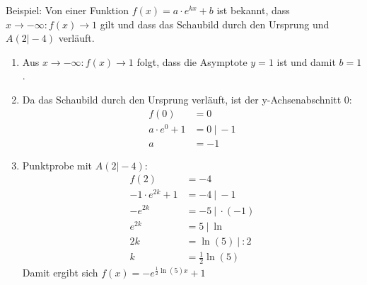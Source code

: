 Beispiel: Von einer Funktion \(f(x)=a\cdot e^{kx}+b\) ist bekannt, dass \(x\to-\infty\colon f(x)\to1\) gilt und dass das Schaubild durch den Ursprung und \(A(2\vert-4)\) verläuft.
\textcolor{loes}{
	\begin{enumerate}[label=\arabic*)]
		\item Aus \(x\to-\infty\colon f(x)\to1\) folgt, dass die Asymptote \(y=1\) ist und damit \(b=1\).
		\item Da das Schaubild durch den Ursprung verläuft, ist der y-Achsenabschnitt 0:
		\begin{align*}
			f(0)&=0\\
			a\cdot e^0+1&=0\ \vert\ -1\\
			a&=-1
		\end{align*}
		\item Punktprobe mit \(A(2\vert-4)\):
		\begin{align*}
			f(2)&=-4\\
			-1\cdot e^{2k}+1&=-4\ \vert\ -1\\
			-e^{2k}&=-5\ \vert\ \cdot(-1)\\
			e^{2k}&=5\ \vert\ \ln\\
			2k&=\ln\left(5\right)\ \vert\ :2\\
			k&=\frac{1}{2}\ln\left(5\right)
		\end{align*}
		Damit ergibt sich \(f(x)=-e^{\frac{1}{2}\ln\left(5\right)x}+1\)
\end{enumerate}}
\newpage
